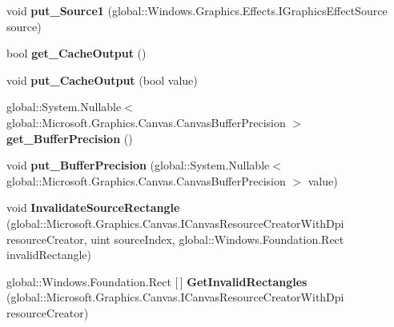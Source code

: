 \begin{DoxyCompactItemize}
void {\bfseries put\+\_\+\+Source1} (global\+::\+Windows.\+Graphics.\+Effects.\+I\+Graphics\+Effect\+Source source)
\item 
\mbox{\label{class_microsoft_1_1_graphics_1_1_canvas_1_1_effects_1_1_cross_fade_effect_a8e3589682f0d148492f35236f8ccfba7}} 
bool {\bfseries get\+\_\+\+Cache\+Output} ()
\item 
\mbox{\label{class_microsoft_1_1_graphics_1_1_canvas_1_1_effects_1_1_cross_fade_effect_a8332e6ad0fb1e1aceda5417f290ce62f}} 
void {\bfseries put\+\_\+\+Cache\+Output} (bool value)
\item 
\mbox{\label{class_microsoft_1_1_graphics_1_1_canvas_1_1_effects_1_1_cross_fade_effect_a0ca90f8254840e1cd6acb7017be2d7aa}} 
global\+::\+System.\+Nullable$<$ global\+::\+Microsoft.\+Graphics.\+Canvas.\+Canvas\+Buffer\+Precision $>$ {\bfseries get\+\_\+\+Buffer\+Precision} ()
\item 
\mbox{\label{class_microsoft_1_1_graphics_1_1_canvas_1_1_effects_1_1_cross_fade_effect_ad2ee508e3e5be9ddc1bdb048194edcf4}} 
void {\bfseries put\+\_\+\+Buffer\+Precision} (global\+::\+System.\+Nullable$<$ global\+::\+Microsoft.\+Graphics.\+Canvas.\+Canvas\+Buffer\+Precision $>$ value)
\item 
\mbox{\label{class_microsoft_1_1_graphics_1_1_canvas_1_1_effects_1_1_cross_fade_effect_ae3c0feec4d05fd40b5ddd7382e92ed4a}} 
void {\bfseries Invalidate\+Source\+Rectangle} (global\+::\+Microsoft.\+Graphics.\+Canvas.\+I\+Canvas\+Resource\+Creator\+With\+Dpi resource\+Creator, uint source\+Index, global\+::\+Windows.\+Foundation.\+Rect invalid\+Rectangle)
\item 
\mbox{\label{class_microsoft_1_1_graphics_1_1_canvas_1_1_effects_1_1_cross_fade_effect_a6300de58866141114dd504fe55c007f1}} 
global\+::\+Windows.\+Foundation.\+Rect \mbox{[}$\,$\mbox{]} {\bfseries Get\+Invalid\+Rectangles} (global\+::\+Microsoft.\+Graphics.\+Canvas.\+I\+Canvas\+Resource\+Creator\+With\+Dpi resource\+Creator)

\end{DoxyCompactItemize}
